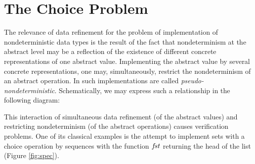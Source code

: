 \section{The Choice Problem}\label{se:choiceproblem} The relevance of data refinement for the problem of implementation of nondeterministic data types is the result of the fact that nondeterminism at the abstract level may be a reflection of the existence of different concrete representations of one abstract value. Implementing the abstract value by several concrete representations, one may, simultaneously, restrict the nondeterminism of an abstract operation. In \cite{Sub} such implementations are called {\em pseudo-nondeterministic}. Schematically, we may express such a relationship in the following diagram: \begin{center}

\end{center}
This interaction of simultaneous data refinement (of the abstract values) and restricting nondeterminism (of the abstract operations) causes verification problems.
One of its classical examples is the attempt to implement sets with a
choice operation by sequences with the function $f\!st$ returning the head of 
the list (Figure \ref{fig:spec}). 
